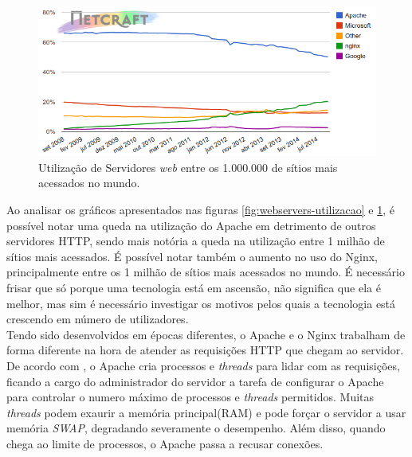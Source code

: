 \begin{figure}[htb]
	\centering
	\includegraphics[width=1\linewidth]{figuras/grafico2} 
	\caption{Utilização de Servidores \textit{web} entre os 1.000.000 de sítios 
	mais acessados no mundo.}
	\label{fig:webservers-utilizacao-milhao}
\end{figure}
Ao analisar os gráficos apresentados nas figuras 
\ref{fig:webservers-utilizacao} e \ref{fig:webservers-utilizacao-milhao}, é 
possível notar uma queda na 
utilização do Apache em detrimento de outros servidores HTTP, sendo mais 
notória a queda na utilização entre 1 milhão de sítios mais acessados. É 
possível notar também o aumento no uso do Nginx, principalmente entre os 1 
milhão de sítios mais acessados no mundo. É necessário frisar que só porque uma 
tecnologia está em ascensão, não significa que ela é melhor, mas sim é 
necessário investigar os motivos pelos quais a tecnologia está crescendo em 
número de utilizadores.\\
Tendo sido desenvolvidos em épocas diferentes, o Apache e o Nginx trabalham de 
forma diferente na hora de atender as requisições HTTP que chegam ao servidor.\\
De acordo com , o Apache cria processos e \textit{threads} 
para lidar com as requisições, ficando a cargo do administrador do servidor a 
tarefa de configurar o Apache para controlar o numero máximo de processos e 
\textit{threads} permitidos. Muitas \textit{threads} podem exaurir a memória 
principal(RAM) e pode forçar o servidor a usar memória \textit{SWAP}, 
degradando severamente o desempenho. Além disso, quando chega ao limite de 
processos, o Apache passa a recusar conexões.
